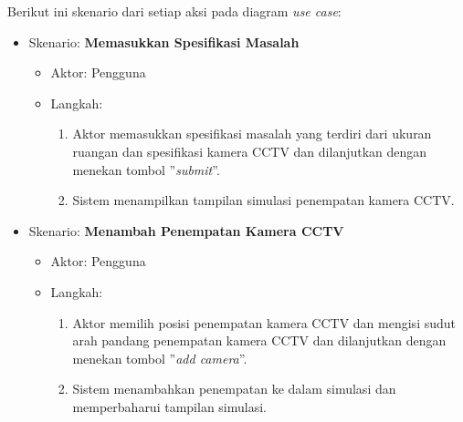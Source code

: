 Berikut ini skenario dari setiap aksi pada diagram \textit{use case}:
\begin{itemize}
	\item Skenario: \textbf{Memasukkan Spesifikasi Masalah}
	\begin{itemize}
		\item Aktor: Pengguna
		\item Langkah:
		\begin{enumerate}
			\item Aktor memasukkan spesifikasi masalah yang terdiri dari ukuran ruangan dan spesifikasi kamera CCTV dan dilanjutkan dengan menekan tombol ''\textit{submit}''.
			\item Sistem menampilkan tampilan simulasi penempatan kamera CCTV.
		\end{enumerate}
	\end{itemize}
	\item Skenario: \textbf{Menambah Penempatan Kamera CCTV}
	\begin{itemize}
		\item Aktor: Pengguna
		\item Langkah:
		\begin{enumerate}
			\item Aktor memilih posisi penempatan kamera CCTV dan mengisi sudut arah pandang penempatan kamera CCTV dan dilanjutkan dengan menekan tombol ''\textit{add camera}''.
			\item Sistem menambahkan penempatan ke dalam simulasi dan memperbaharui tampilan simulasi.
		\end{enumerate}
	\end{itemize}

\end{itemize}
